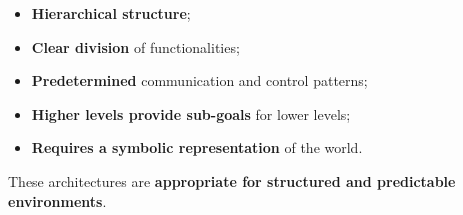 \begin{itemize}
    \item \textbf{Hierarchical structure};
    \item \textbf{Clear division} of functionalities;
    \item \textbf{Predetermined} communication and control patterns;
    \item \textbf{Higher levels provide sub-goals} for lower levels;
    \item \textbf{Requires a symbolic representation} of the world.
\end{itemize}

 These architectures are \textbf{appropriate for structured and predictable environments}.


